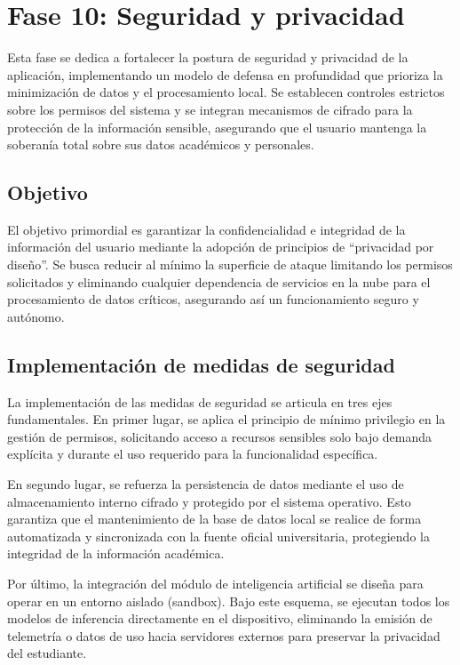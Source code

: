 \section{Fase 10: Seguridad y privacidad}

Esta fase se dedica a fortalecer la postura de seguridad y privacidad de la aplicación, implementando un modelo de defensa en profundidad que prioriza la minimización de datos y el procesamiento local. Se establecen controles estrictos sobre los permisos del sistema y se integran mecanismos de cifrado para la protección de la información sensible, asegurando que el usuario mantenga la soberanía total sobre sus datos académicos y personales.

\subsection{Objetivo}
El objetivo primordial es garantizar la confidencialidad e integridad de la información del usuario mediante la adopción de principios de ``privacidad por diseño''. Se busca reducir al mínimo la superficie de ataque limitando los permisos solicitados y eliminando cualquier dependencia de servicios en la nube para el procesamiento de datos críticos, asegurando así un funcionamiento seguro y autónomo.

\subsection{Implementación de medidas de seguridad}
La implementación de las medidas de seguridad se articula en tres ejes fundamentales. En primer lugar, se aplica el principio de mínimo privilegio en la gestión de permisos, solicitando acceso a recursos sensibles solo bajo demanda explícita y durante el uso requerido para la funcionalidad específica.

En segundo lugar, se refuerza la persistencia de datos mediante el uso de almacenamiento interno cifrado y protegido por el sistema operativo. Esto garantiza que el mantenimiento de la base de datos local se realice de forma automatizada y sincronizada con la fuente oficial universitaria, protegiendo la integridad de la información académica.

Por último, la integración del módulo de inteligencia artificial se diseña para operar en un entorno aislado (sandbox). Bajo este esquema, se ejecutan todos los modelos de inferencia directamente en el dispositivo, eliminando la emisión de telemetría o datos de uso hacia servidores externos para preservar la privacidad del estudiante.


